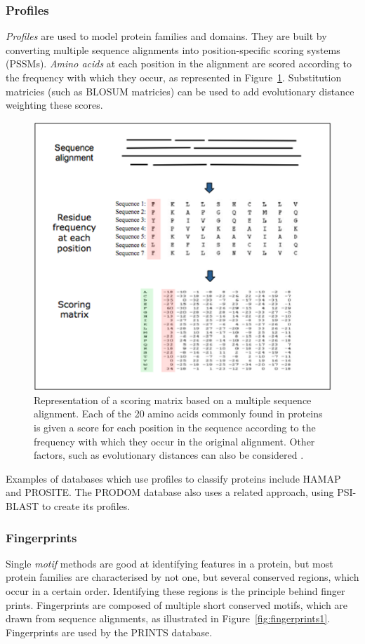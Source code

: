 \documentclass{article}
\begin{document}
\subsubsection*{Profiles}

{\em Profiles} are used to model protein families and domains. They are built by converting multiple sequence alignments into position-specific scoring systems (PSSMs). {\em Amino acids} at each position in the alignment are scored according to the frequency with which they occur, as represented in Figure~\ref{fig:profile}. Substitution matricies (such as BLOSUM matricies) can be used to add evolutionary distance weighting these scores. 

\begin{figure}[h!]
\centering
\includegraphics[width=.5\textwidth]{profile.png}
\caption{Representation of a scoring matrix based on a multiple sequence alignment. Each of the 20 amino acids commonly found in proteins is given a score for each position in the sequence according to the frequency with which they occur in the original alignment. Other factors, such as evolutionary distances can also be considered \cite{EBI}.}
\label{fig:profile}
\end{figure}

Examples of databases which use profiles to classify proteins include HAMAP and PROSITE. The PRODOM database also uses a related approach, using PSI-BLAST to create its profiles. 

\subsubsection*{Fingerprints}

Single {\em motif} methods are good at identifying features in a protein, but most protein families are characterised by not one, but several conserved regions, which occur in a certain order. Identifying these regions is the principle behind finger prints. Fingerprints are composed of multiple short conserved motifs, which are drawn from sequence alignments, as illustrated in Figure~\ref{fig:fingerprints1}. Fingerprints are used by the PRINTS database.
\end{document}
